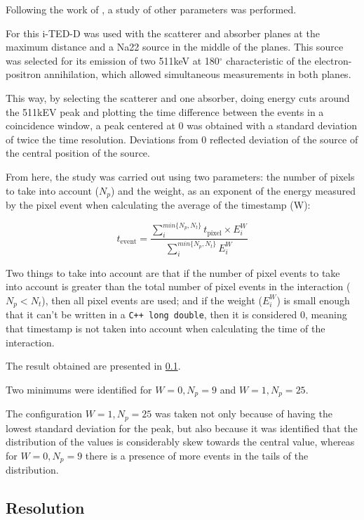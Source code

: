 Following the work of \cite{}, a study of other parameters was performed.

For this \ac{i-TED}-D was used with the scatterer and absorber planes at the maximum distance and a Na22 source in the middle of the planes. This source was selected for its emission of two 511keV \gamma at 180$^\circ$ characteristic of the electron-positron annihilation, which allowed simultaneous measurements in both planes.

This way, by selecting the scatterer and one absorber, doing energy cuts around the 511kEV peak and plotting the time difference between the events in a coincidence window, a peak centered at 0 was obtained with a standard deviation of twice the time resolution. Deviations from 0 reflected deviation of the source of the central position of the source.

From here, the study was carried out using two parameters: the number of pixels to take into account ($N_p$) and the weight, as an exponent of the energy measured by the pixel event when calculating the average of the timestamp (W):

\begin{equation}
    t_\text{event}=\frac{\sum_{i}^{min\{N_p,N_t\}}t_\text{pixel}\times E_i^W}{\sum_{i}^{min\{N_p,N_t\}}E_i^W}
\end{equation}

Two things to take into account are that if the number of pixel events to take into account is greater than the total number of pixel events in the interaction ($N_p<N_t$), then all pixel events are used; and if the weight ($E_i^W$) is small enough that it can't be written in a \texttt{C++ long double}, then it is considered 0, meaning that timestamp is not taken into account when calculating the time of the interaction.

The result obtained are presented in \ref{}.

Two minimums were identified for $W=0, N_p=9$ and $W=1, N_p=25$.

The configuration $W=1, N_p=25$ was taken not only because of having the lowest standard deviation for the peak, but also because it was identified that the distribution of the values is considerably skew towards the central value, whereas for $W=0, N_p=9$ there is a presence of more events in the tails of the distribution.

\subsection{Resolution}

